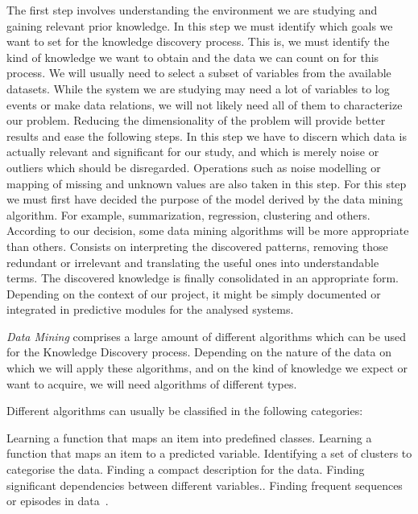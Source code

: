 \begin{enumerate}
  The first step involves understanding the environment we are studying and gaining relevant prior knowledge. In this step we must identify which goals we want to set for the knowledge discovery process. This is, we must identify the kind of knowledge we want to obtain and the data we can count on for this process.
  We will usually need to select a subset of variables from the available datasets. While the system we are studying may need a lot of variables to log events or make data relations, we will not likely need all of them to characterize our problem. Reducing the dimensionality of the problem will provide better results and ease the following steps.
  In this step we have to discern which data is actually relevant and significant for our study, and which is merely noise or outliers which should be disregarded. Operations such as noise modelling or mapping of missing and unknown values are also taken in this step.
  For this step we must first have decided the purpose of the model derived by the data mining algorithm. For example, summarization, regression, clustering and others. According to our decision, some data mining algorithms will be more appropriate than others.
  Consists on interpreting the discovered patterns, removing those redundant or irrelevant and translating the useful ones into understandable terms.
  The discovered knowledge is finally consolidated in an appropriate form. Depending on the context of our project, it might be simply documented or integrated in predictive modules for the analysed systems.
\end{enumerate}

\emph{Data Mining} comprises a large amount of different algorithms which can be used for the Knowledge Discovery process. Depending on the nature of the data on which we will apply these algorithms, and on the kind of knowledge we expect or want to acquire, we will need algorithms of different types.

Different algorithms can usually be classified in the following categories:

\begin{enumerate}
  Learning a function that maps an item into predefined classes.
  Learning a function that maps an item to a predicted variable.
  Identifying a set of clusters to categorise the data.
  Finding a compact description for the data.
  Finding significant dependencies between different variables.\cite{Zhao2003association}.
  Finding frequent sequences or episodes in data~\cite{zhao2003sequential,weiss2002predicting}.
\end{enumerate}

